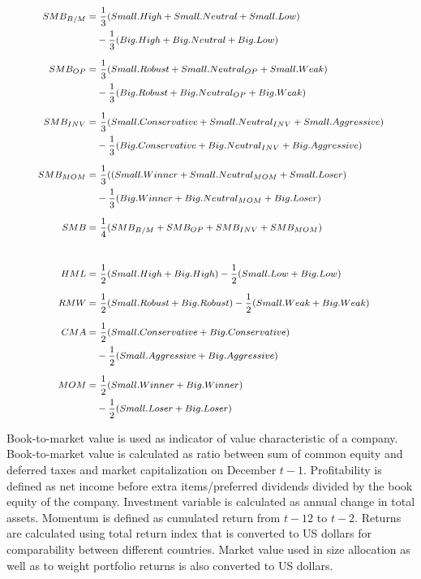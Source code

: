 \documentclass[12pt]{article}
\begin{document}
\begin{equation} \label{eq:FF6factors}
\footnotesize
\begin{split}
SMB_{B/M} = & \ \frac{1}{3} (Small.High + Small.Neutral + Small.Low) \\
			& - \frac{1}{3} (Big.High + Big.Neutral + Big.Low) \\[5pt]
SMB_{OP} = & \ \frac{1}{3} (Small.Robust + Small.Neutral_{OP} + Small.Weak)\\
			& - \frac{1}{3} (Big.Robust + Big.Neutral_{OP} + Big.Weak)\\[5pt]
SMB_{INV} = & \ \frac{1}{3} (Small.Conservative + Small.Neutral_{INV} + Small.Aggressive)\\
			& - \frac{1}{3} (Big.Conservative + Big.Neutral_{INV} + Big.Aggressive)\\[5pt]
SMB_{MOM} = & \ \frac{1}{3} ((Small.Winner + Small.Neutral_{MOM} + Small.Loser)\\
		     	& - \frac{1}{3} (Big.Winner + Big.Neutral_{MOM} + Big.Loser)\\[5pt]
SMB = & \ \frac{1}{4} (SMB_{B/M} + SMB_{OP} + SMB_{INV} + SMB_{MOM})\\[20pt]
HML = & \ \frac{1}{2} (Small.High + Big.High) - \frac{1}{2} (Small.Low + Big.Low)\\[5pt]
RMW = & \ \frac{1}{2} (Small.Robust + Big.Robust) - \frac{1}{2} (Small.Weak + Big.Weak)\\[5pt]
CMA = & \ \frac{1}{2} (Small.Conservative + Big.Conservative)\\
		& - \frac{1}{2} (Small.Aggressive + Big.Aggressive)\\[5pt]
MOM = & \ \frac{1}{2} (Small.Winner + Big.Winner)\\
		& - \frac{1}{2} (Small.Loser + Big.Loser)\\
\end{split}
\end{equation}

Book-to-market value is used as indicator of value characteristic of a company. Book-to-market value is calculated as ratio between sum of common equity and deferred taxes and market capitalization on December $t-1$. Profitability is defined as net income before extra items/preferred dividends divided by the book equity of the company. Investment variable is calculated as annual change in total assets. Momentum is defined as cumulated return from $t-12$ to $t-2$. Returns are calculated using total return index that is converted to US dollars for comparability between different countries. Market value used in size allocation as well as to weight portfolio returns is also converted to US dollars. \par
\end{document}
